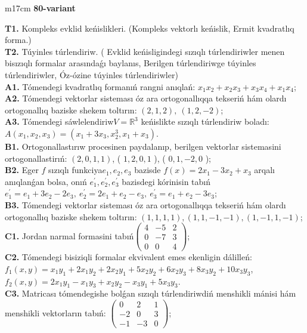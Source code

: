 \documentclass{article}
\begin{document}
\begin{tabular}{m{17cm}}
\textbf{80-variant}
\newline

\textbf{T1.} Kompleks evklid keńislikleri.  (Kompleks vektorlı keńislik, Ermit kvadratlıq forma.) \\
\textbf{T2.} Túyinles túrlendiriw. ( Evklid keńisligindegi sızıqlı túrlendiriwler menen bisızıqlı formalar arasındaǵı baylanıs, Berilgen túrlendiriwge túyinles túrlendiriwler, Óz-ózine túyinles túrlendiriwler) \\
\textbf{A1.} Tómendegi kvadratlıq formanıń rangni anıqlań: \(x_{1}x_{2} + x_{2}x_{3} + x_{3}x_{4} + x_{1}x_{4}\); \\
\textbf{A2.} Tómendegi vektorlar sisteması óz ara ortogonallıqqa tekseriń hám olardı ortogonallıq baziske shekem toltırın: \((2,1,2),\ (1,2, - 2)\); \\
\textbf{A3.} Tómendegi sáwlelendiriw\(V = \mathbb{R}^{3}\) keńislikte sızıqlı túrlendiriw boladı: \(A\left( x_{1},x_{2},x_{3} \right) = \left( x_{1} + 3x_{3},x_{2}^{3},x_{1} + x_{3} \right)\). \\
\textbf{B1.} Ortogonallastırıw procesinen paydalanıp, berilgen vektorlar sistemasini ortogonallastirıń: \((2,0,1,1)\), ( \(1,2,0,1\) ), ( \(0,1, - 2,0\) ); \\
\textbf{B2.} Eger \(f\) sızıqlı funkciya\(e_{1},e_{2},e_{3}\) bazisde \(f(x) = 2x_{1} - 3x_{2} + x_{3}\) arqalı anıqlanǵan bolsa, onıń \(e_{1}^{'},e_{2}^{'},e_{3}^{'}\) bazisdegi kórinisin tabıń\(e_{1}^{'} = e_{1} + 3e_{2} - 2e_{3},\ e_{2}^{'} = 2e_{1} + e_{2} - e_{3},\ e_{3}^{'} = e_{1} + e_{2} - 3e_{3}\); \\
\textbf{B3.} Tómendegi vektorlar sisteması óz ara ortogonallıqqa tekseriń hám olardı ortogonallıq baziske shekem toltırın: \((1,1,1,1),(1,1, - 1, - 1),(1, - 1,1, - 1)\); \\
\textbf{C1.} Jordan narmal formasini tabıń\(\begin{pmatrix} 4 & - 5 & 2 \\ 0 & - 7 & 3 \\ 0 & 0 & 4 \end{pmatrix}\); \\
\textbf{C2.} Tómendegi bisiziqli formalar ekvivalent emes ekenligin dálilleń:\(f_{1}(x,y) = x_{1}y_{1} + 2x_{1}y_{2} + 2x_{2}y_{1} + 5x_{2}y_{2} + 6x_{2}y_{3} + 8x_{3}y_{2} + 10x_{3}y_{3}\), \(f_{2}(x,y) = 2x_{1}y_{1} - x_{1}y_{3} + x_{2}y_{2} - x_{3}y_{1} + 5x_{3}y_{3}\). \\
\textbf{C3.} Matricası tómendegishe bolǵan sızıqlı túrlendiriwdiń menshikli mánisi hám menshikli vektorların tabıń: \(\begin{pmatrix} 0 & 2 & 1 \\  - 2 & 0 & 3 \\  - 1 & - 3 & 0 \end{pmatrix}\); \\

\end{tabular}
\vspace{1cm}
\end{document}
